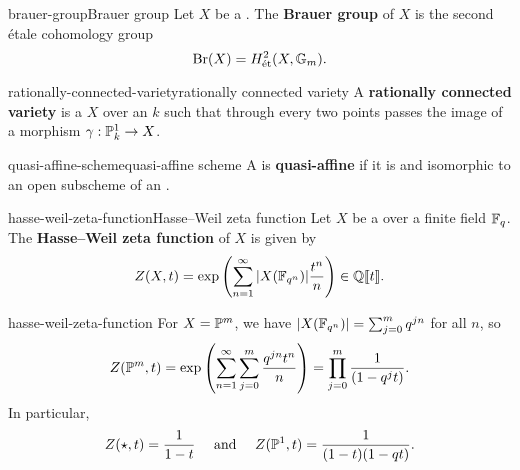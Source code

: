 \begin{topic}{brauer-group}{Brauer group}
    Let $X$ be a . The \textbf{Brauer group} of $X$ is the second étale cohomology group
    \[ \textup{Br}(X) = H^2_\textup{ét}(X, \mathbb{G}_m) . \]
\end{topic}

\begin{topic}{rationally-connected-variety}{rationally connected variety}
    A \textbf{rationally connected variety} is a  $X$ over an  $k$ such that through every two points passes the image of a morphism $\gamma : \mathbb{P}^1_k \to X$.
\end{topic}

\begin{topic}{quasi-affine-scheme}{quasi-affine scheme}
    A  is \textbf{quasi-affine} if it is  and isomorphic to an open subscheme of an .
\end{topic}

\begin{topic}{hasse-weil-zeta-function}{Hasse--Weil zeta function}
    Let $X$ be a  over a finite field $\mathbb{F}_q$. The \textbf{Hasse--Weil zeta function} of $X$ is given by
    \[ Z(X, t) = \exp \left( \sum_{n = 1}^{\infty} |X(\mathbb{F}_{q^n})| \frac{t^n}{n} \right) \in \mathbb{Q} \llbracket t \rrbracket . \]
\end{topic}

\begin{example}{hasse-weil-zeta-function}
    For $X = \mathbb{P}^m$, we have $|X(\mathbb{F}_{q^n})| = \sum_{j = 0}^{m} q^{jn}$ for all $n$, so
    \[ Z(\mathbb{P}^m, t) = \exp \left( \sum_{n = 1}^{\infty} \sum_{j = 0}^{m} \frac{q^{jn} t^n}{n} \right) = \prod_{j = 0}^{m} \frac{1}{(1 - q^j t)} . \]
    In particular,
    \[ Z(\star, t) = \frac{1}{1 - t} \quad \textup{ and } \quad Z(\mathbb{P}^1, t) = \frac{1}{(1 - t)(1 - qt)} . \]
\end{example}

